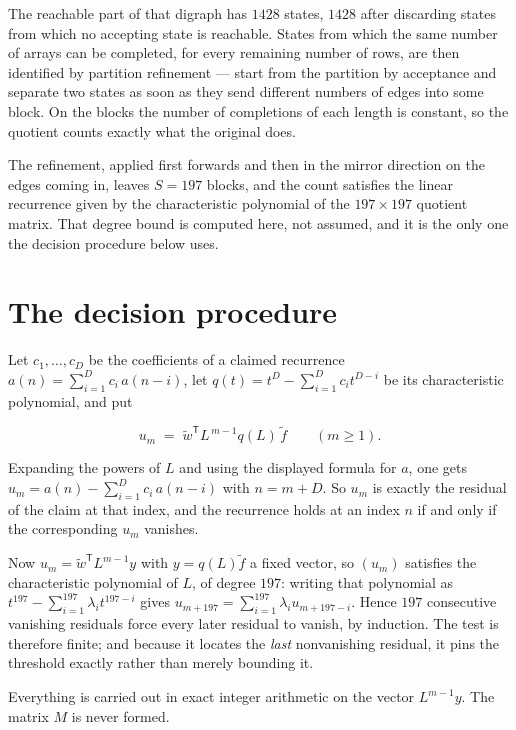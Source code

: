 \documentclass[11pt]{article}
\theoremstyle{definition}
\begin{document}
The reachable part of that digraph has $1428$ states, $1428$ after discarding states from which no accepting state is reachable. States from which the same number of arrays can be completed, for every remaining number of rows, are then identified by partition refinement --- start from the partition by acceptance and separate two states as soon as they send different numbers of edges into some block. On the blocks the number of completions of each length is constant, so the quotient counts exactly what the original does.

The refinement, applied first forwards and then in the mirror direction on the edges coming in, leaves $S = 197$ blocks, and the count satisfies the linear recurrence given by the characteristic polynomial of the $197 \times 197$ quotient matrix. That degree bound is computed here, not assumed, and it is the only one the decision procedure below uses.

\section{The decision procedure}

Let $c_1,\dots,c_D$ be the coefficients of a claimed recurrence $a(n) = \sum_{i=1}^{D} c_i\,a(n-i)$, let $q(t) = t^{D} - \sum_{i=1}^{D} c_i t^{D-i}$ be its characteristic polynomial, and put

\[u_m \;=\; \tilde w^{\mathsf T} L^{\,m-1} q(L)\,\tilde f \qquad (m \ge 1).\]

Expanding the powers of $L$ and using the displayed formula for $a$, one gets $u_m = a(n) - \sum_{i=1}^{D} c_i\,a(n-i)$ with $n = m + D$. So $u_m$ is exactly the residual of the claim at that index, and the recurrence holds at an index $n$ if and only if the corresponding $u_m$ vanishes.

Now $u_m = \tilde w^{\mathsf T} L^{m-1} y$ with $y = q(L)\tilde f$ a fixed vector, so $(u_m)$ satisfies the characteristic polynomial of $L$, of degree $197$: writing that polynomial as $t^{197} - \sum_{i=1}^{197} \lambda_i t^{197-i}$ gives $u_{m+197} = \sum_{i=1}^{197} \lambda_i u_{m+197-i}$. Hence $197$ consecutive vanishing residuals force every later residual to vanish, by induction. The test is therefore finite; and because it locates the {\itshape last} nonvanishing residual, it pins the threshold exactly rather than merely bounding it.

Everything is carried out in exact integer arithmetic on the vector $L^{m-1}y$. The matrix $M$ is never formed.
\end{document}

